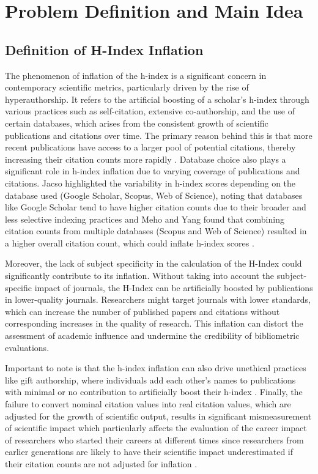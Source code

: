 \chapter{Problem Definition and Main Idea}
\label{ch:problem}

\section{Definition of H-Index Inflation}
The phenomenon of inflation of the h-index is a significant concern in
contemporary scientific metrics, particularly driven by the rise of
hyperauthorship. It refers to the artificial boosting of a scholar's h-index
through various practices such as self-citation, extensive co-authorship, and
the use of certain databases, which arises from the consistent growth of
scientific publications and citations over time. The primary reason behind this
is that more recent publications have access to a larger pool of potential
citations, thereby increasing their citation counts more rapidly
\cite{norris2010h, koltun2021h, bi2023four}. Database choice also plays a
significant role in h-index inflation due to varying coverage of publications
and citations. Jacso highlighted the variability in h-index scores depending on
the database used (Google Scholar, Scopus, Web of Science), noting that
databases like Google Scholar tend to have higher citation counts due to their
broader and less selective indexing practices and Meho and Yang found that
combining citation counts from multiple databases (Scopus and Web of Science)
resulted in a higher overall citation count, which could inflate h-index scores
\cite{norris2010h}.

Moreover, the lack of subject specificity in the calculation of the H-Index
could significantly contribute to its inflation. Without taking into account the
subject-specific impact of journals, the H-Index can be artificially boosted by
publications in lower-quality journals. Researchers might target journals with
lower standards, which can increase the number of published papers and
citations without corresponding increases in the quality of research. This
inflation can distort the assessment of academic influence and undermine the
credibility of bibliometric evaluations.

Important to note is that the h-index inflation can also drive unethical practices
like gift authorship, where individuals add each other’s names to publications
with minimal or no contribution to artificially boost their h-index
\cite{bi2023four}. Finally, the failure to convert nominal citation values into
real citation values, which are adjusted for the growth of scientific output,
results in significant mismeasurement of scientific impact which particularly
affects the evaluation of the career impact of researchers who started their
careers at different times since researchers from earlier generations are
likely to have their scientific impact underestimated if their citation counts
are not adjusted for inflation \cite{petersen2019methods}.

